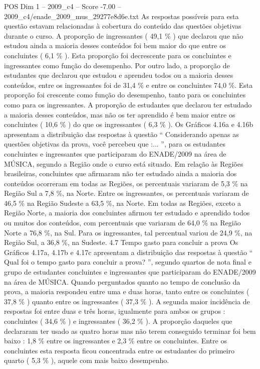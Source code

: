 \begin{textsample}{POS Dim 1 – 2009\_c4 – Score -7.00 – 2009\_c4/enade\_2009\_mus\_29277e8d6e.txt}
As respostas possíveis para esta questão estavam relacionadas à cobertura do conteúdo das questões objetivas durante o curso.
A proporção de ingressantes ( 49,1 \% ) que declarou que não estudou ainda a maioria desses conteúdos foi bem maior do que entre os concluintes ( 6,1 \% ).
Esta proporção foi decrescente para os concluintes e ingressantes como função do desempenho.
Por outro lado, a proporção de estudantes que declarou que estudou e aprendeu todos ou a maioria desses conteúdos, entre os ingressantes foi de 31,4 \% e entre os concluintes 74,0 \%.
Esta proporção foi crescente como função do desempenho, tanto para os concluintes como para os ingressantes.
A proporção de estudantes que declarou ter estudado a maioria desses conteúdos, mas não os ter aprendido é bem maior entre os concluintes ( 10,6 \% ) do que os ingressantes ( 6,3 \% ).
Os Gráficos 4.16a e 4.16b apresentam a distribuição das respostas à questão “ Considerando apenas as questões objetivas da prova, você percebeu que :... ”, para os estudantes concluintes e ingressantes que participaram do ENADE/2009 na área de MÚSICA, segundo a Região onde o curso está situado.
Em relação às Regiões brasileiras, concluintes que afirmaram não ter estudado ainda a maioria dos conteúdos ocorreram em todas as Regiões, os percentuais variaram de 5,3 \% na Região Sul a 7,8 \%, na Norte.
Entre os ingressantes, os percentuais variaram de 46,5 \% na Região Sudeste a 63,5 \%, na Norte.
Em todas as Regiões, exceto a Região Norte, a maioria dos concluintes afirmou ter estudado e aprendido todos ou muitos dos conteúdos, com percentuais que variaram de 64,0 \% na Região Norte a 76,8 \%, na Sul.
Para os ingressantes, tal percentual variou de 24,9 \%, na Região Sul, a 36,8 \%, na Sudeste. 4.7 Tempo gasto para concluir a prova Os Gráficos 4.17a, 4.17b e 4.17c apresentam a distribuição das respostas à questão “ Qual foi o tempo gasto para concluir a prova? ”, segundo quartos de nota final e grupo de estudantes concluintes e ingressantes que participaram do ENADE/2009 na área de MÚSICA.
Quando perguntados quanto ao tempo de conclusão da prova, a maioria respondeu entre uma e duas horas, tanto entre os concluintes ( 37,8 \% ) quanto entre os ingressantes ( 37,3 \% ).
A segunda maior incidência de respostas foi entre duas e três horas, igualmente para ambos os grupos : concluintes ( 34,6 \% ) e ingressantes ( 36,2 \% ).
A proporção daqueles que declararam ter usado as quatro horas mas não terem conseguido terminar foi bem baixo : 1,8 \% entre os ingressantes e 2,3 \% entre os concluintes.
Entre os concluintes esta resposta ficou concentrada entre os estudantes do primeiro quarto ( 5,3 \% ), aquele com mais baixo desempenho.

\end{textsample}
